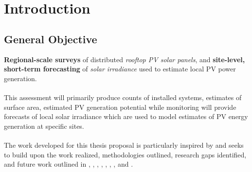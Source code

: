 \section{Introduction}



\subsection{General Objective}
    \vspace{0.5cm}
    
    \textbf{Regional-scale surveys} of distributed \textit{rooftop PV solar panels}, and \textbf{site-level, short-term forecasting} of \textit{solar irradiance} used to estimate local PV power generation. \\
    \\
    This assessment will primarily produce counts of installed systems, estimates of surface area, estimated PV generation potential while monitoring will provide forecasts of local solar irradiance which are used to model estimates of PV energy generation at specific sites. \\
    \\ 
    The work developed for this thesis proposal is particularly inspired by and seeks to build upon the work realized, methodologies outlined, research gaps identified, and future work outlined in \cite{maxar_germany_pv_dataset}, \cite{Hu_solar_array_pitfalls_2022}, \cite{de-Hoog_sota_survey_2020}, \cite{Bansal_ssl_nowcasting_2022}, \cite{He_universal_pv_spectral_index_2024}, \cite{Jiang_rooftop_pv_assessment_2022}, \cite{Tremenbert_Kasmi_pyPV_roof_2023}, and \cite{Yu_deep_solar_2018}.

